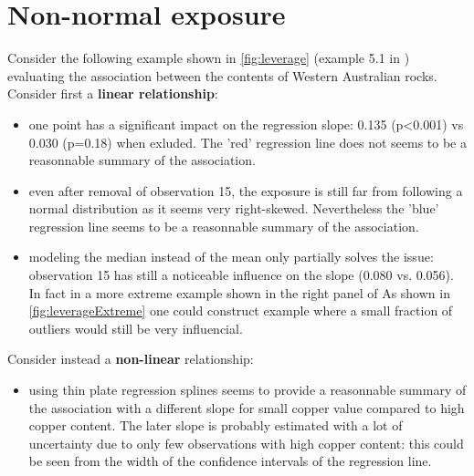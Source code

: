 \documentclass[12pt]{article}
\begin{document}
\clearpage

\section{Non-normal exposure}
\label{sec:exposure}
Consider the following example shown in \autoref{fig:leverage} (example 5.1 in \cite{maronna2019robust}) evaluating the association between the
contents of Western Australian rocks. Consider first a \textbf{linear
relationship}:
\begin{itemize}
\item one point has a significant impact on the regression slope: 0.135
(p<0.001) vs 0.030 (p=0.18) when exluded. The 'red' regression line
does not seems to be a reasonnable summary of the association.
\item even after removal of observation 15, the exposure is still far from
following a normal distribution as it seems very
right-skewed. Nevertheless the 'blue' regression line seems to be a
reasonnable summary of the association.
\item modeling the median instead of the mean only partially solves the
issue: observation 15 has still a noticeable influence on the slope
(0.080 vs. 0.056). In fact in a more extreme example shown in the
right panel of As shown in \autoref{fig:leverageExtreme} one could
construct example where a small fraction of outliers would still be
very influencial.
\end{itemize}

\noindent Consider instead a \textbf{non-linear} relationship:
\begin{itemize}
\item using thin plate regression splines seems to provide a reasonnable
summary of the association with a different slope for small copper
value compared to high copper content. The later slope is probably
estimated with a lot of uncertainty due to only few observations
with high copper content: this could be seen from the width of the
confidence intervals of the regression line.
\end{itemize}

\vspace{-1cm}
\end{document}
